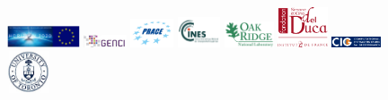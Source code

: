 \begin{figure}[htbp]
\begin{centering}
%
\includegraphics[width=0.190\textwidth]{figures/logo_European_Union.png}\vspace*{2truemm}
\includegraphics[width=0.112\textwidth]{figures/logo_GENCI.jpg}\vspace*{2truemm}
\includegraphics[width=0.112\textwidth]{figures/logo_PRACE.jpg}\vspace*{2truemm}
\includegraphics[width=0.112\textwidth]{figures/logo_CINES.png}\vspace*{2truemm}
\includegraphics[width=0.130\textwidth]{figures/logo_Oak_Ridge.png}\vspace*{2truemm}
\hspace*{3mm}\includegraphics[width=0.130\textwidth]{figures/logo_fondation_Del_Duca.png}\vspace*{2truemm}
\includegraphics[width=0.130\textwidth]{figures/logo_CIG.png}\vspace*{2truemm}
%
%
\includegraphics[width=0.112\textwidth]{figures/logo_University_of_Toronto.jpg}\vspace*{2truemm}

\end{centering}
\end{figure}
